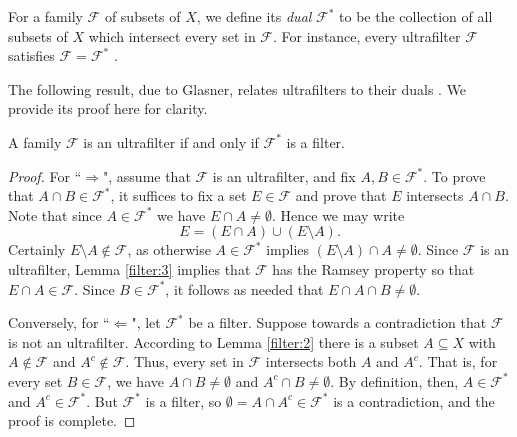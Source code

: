 For a family \( \mathcal{F}  \) of subsets of \( X \), we define its \emph{dual} \( \mathcal{F} ^{\ast}  \) to be the collection of all subsets of \( X \) which intersect every set in \( \mathcal{F}  \). For instance, every ultrafilter \( \mathcal{F}  \) satisfies \( \mathcal{F} = \mathcal{F} ^{\ast}  \) \cite{brian:2016}.

The following result, due to Glasner, relates ultrafilters to their duals \cite{glasner:1980}. We provide its proof here for clarity.

\begin{lemma}
\label{filter:4}
A family \( \mathcal{F}  \) is an ultrafilter if and only if \( \mathcal{F} ^{\ast}  \) is a filter.
\end{lemma}
\begin{proof}
	For ``$\Rightarrow$", assume that \( \mathcal{F}  \) is an ultrafilter, and fix \( A,B \in \mathcal{F} ^{\ast}  \). To prove that \( A \cap B \in \mathcal{F} ^{\ast}  \), it suffices to fix a set \( E \in \mathcal{F}  \) and prove that \( E \) intersects \( A \cap B \). Note that since \( A \in \mathcal{F} ^{\ast}  \) we have \( E \cap A \neq \emptyset  \). Hence we may write \[ E = (E \cap A) \cup (E \setminus A). \] Certainly \( E \setminus A \notin \mathcal{F}  \), as otherwise \( A \in \mathcal{F} ^{\ast}  \) implies \( (E\setminus A) \cap A \neq \emptyset \). Since \( \mathcal{F}  \) is an ultrafilter, Lemma \ref{filter:3} implies that \( \mathcal{F}  \) has the Ramsey property so that \( E \cap A \in \mathcal{F}  \). Since \( B \in \mathcal{F} ^{\ast}  \), it follows as needed that \( E \cap A \cap B \neq \emptyset  \).

	Conversely, for ``$\Leftarrow$", let \( \mathcal{F} ^{\ast}  \) be a filter. Suppose towards a contradiction that \( \mathcal{F}  \) is not an ultrafilter. According to Lemma \ref{filter:2} there is a subset \( A \subseteq X \) with \( A \notin \mathcal{F}  \) and \( A^{c} \notin \mathcal{F}  \). Thus, every set in \( \mathcal{F}  \) intersects both \( A \) and \( A^{c}  \). That is, for every set \( B \in \mathcal{F}  \), we have \( A \cap B \neq \emptyset  \) and \( A^{c} \cap B \neq \emptyset  \). By definition, then, \( A \in \mathcal{F}^{\ast}   \) and \( A^{c} \in \mathcal{F} ^{\ast}  \). But \( \mathcal{F} ^{\ast}  \) is a filter, so \( \emptyset = A \cap A^{c} \in \mathcal{F} ^{\ast}  \) is a contradiction, and the proof is complete.
\end{proof}
